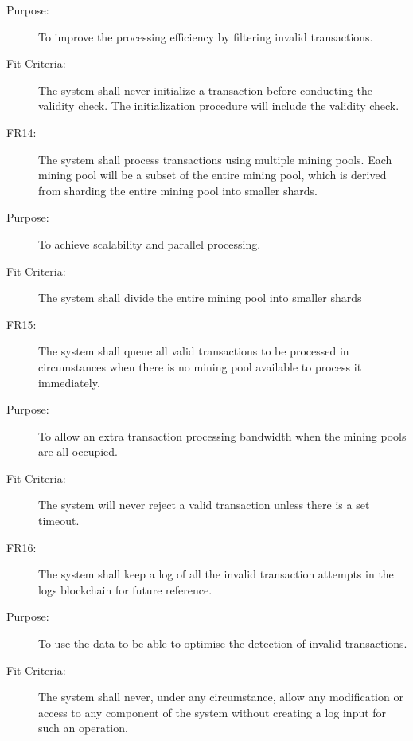 \documentclass[a4paper,twoside,phd]{BYUPhys}
\begin{document}
\begin{description}
\item[Purpose:] To improve the processing efficiency by filtering invalid transactions.
\item[Fit Criteria:] The system shall never initialize a transaction before conducting the validity check. The initialization procedure will include the validity check. 
\\
\item[FR14:] The system shall process transactions using multiple mining pools. Each mining pool will be a subset of the entire mining pool, which is derived from sharding the entire mining pool into smaller shards.
\item[Purpose:] To achieve scalability and parallel processing.
\item[Fit Criteria:] The system shall divide the entire mining pool into smaller shards
\\
\item[FR15:] The system shall queue all valid transactions to be processed in circumstances when there is no mining pool available to process it immediately.
\item[Purpose:] To allow an extra transaction processing bandwidth when the mining pools are all occupied.
\item[Fit Criteria:] The system will never reject a valid transaction unless there is a set timeout.
\\
\item[FR16:] The system shall keep a log of all the invalid transaction attempts in the logs blockchain for future reference.
\item[Purpose:] To use the data to be able to optimise the detection of invalid transactions.
\item[Fit Criteria:] The system shall never, under any circumstance, allow any modification or access to any component of the system without creating a log input for such an operation.
\end{description}
\end{document}
